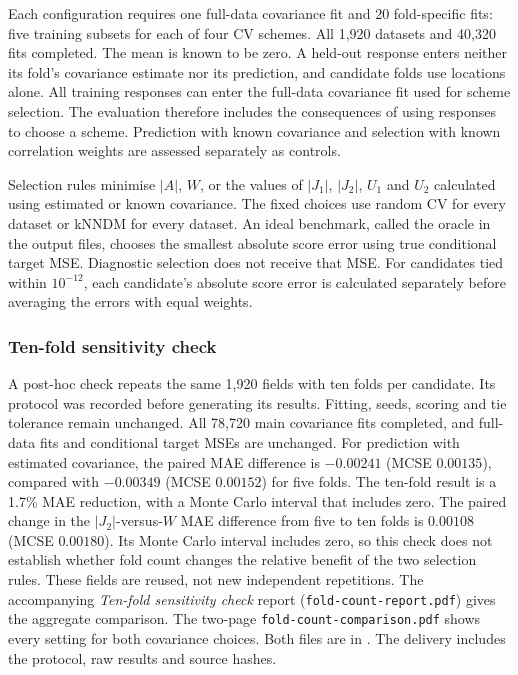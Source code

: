 \documentclass[11pt,a4paper]{article}
\begin{document}
Each configuration requires one full-data covariance fit and 20 fold-specific fits: five training subsets for each of four CV schemes. All 1,920 datasets and 40,320 fits completed. The mean is known to be zero. A held-out response enters neither its fold's covariance estimate nor its prediction, and candidate folds use locations alone. All training responses can enter the full-data covariance fit used for scheme selection. The evaluation therefore includes the consequences of using responses to choose a scheme. Prediction with known covariance and selection with known correlation weights are assessed separately as controls.

Selection rules minimise $|A|$, $W$, or the values of $|J_1|$, $|J_2|$, $U_1$ and $U_2$ calculated using estimated or known covariance. The fixed choices use random CV for every dataset or kNNDM for every dataset. An ideal benchmark, called the oracle in the output files, chooses the smallest absolute score error using true conditional target MSE. Diagnostic selection does not receive that MSE. For candidates tied within $10^{-12}$, each candidate's absolute score error is calculated separately before averaging the errors with equal weights.

\subsubsection{Ten-fold sensitivity check}
\label{sec:tenfold}
A post-hoc check repeats the same 1,920 fields with ten folds per candidate. Its protocol was recorded before generating its results. Fitting, seeds, scoring and tie tolerance remain unchanged. All 78,720 main covariance fits completed, and full-data fits and conditional target MSEs are unchanged. For prediction with estimated covariance, the paired MAE difference is $-0.00241$ (MCSE $0.00135$), compared with $-0.00349$ (MCSE $0.00152$) for five folds. The ten-fold result is a 1.7\% MAE reduction, with a Monte Carlo interval that includes zero. The paired change in the $|J_2|$-versus-$W$ MAE difference from five to ten folds is $0.00108$ (MCSE $0.00180$). Its Monte Carlo interval includes zero, so this check does not establish whether fold count changes the relative benefit of the two selection rules. These fields are reused, not new independent repetitions. The accompanying \textit{Ten-fold sensitivity check} report (\texttt{fold-count-report.pdf}) gives the aggregate comparison. The two-page \texttt{fold-count-comparison.pdf} shows every setting for both covariance choices. Both files are in . The delivery includes the protocol, raw results and source hashes.
\end{document}
